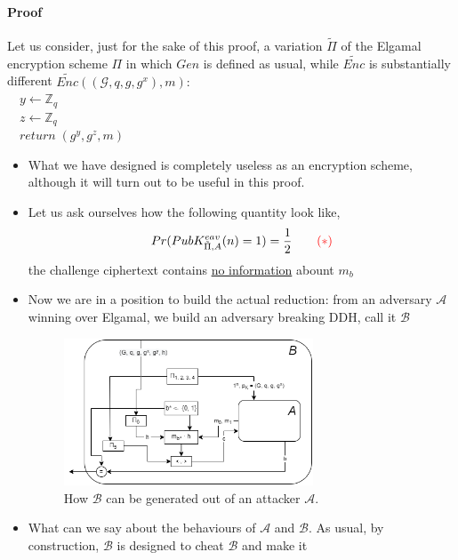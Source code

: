 \documentclass[../main]{subfiles}
\begin{document}
\paragraph{Proof}
    Let us consider, just for the sake of this proof, a variation $\tilde{\Pi}$ of the Elgamal encryption scheme $\Pi$ in which $Gen$ is
    defined as usual, while $\tilde{Enc}$ is substantially different
    \newline
    \noindent
    $\textbf{$\tilde{Enc}$} ((\mathcal{G}, q, g, g^x), m):$\\
    $\quad{} y \leftarrow{} \mathbb{Z}_q$\\
    $\quad{} z \leftarrow{} \mathbb{Z}_q$\\
    $\quad{} \textit{return} \; (g^y, g^z, m) $
    \begin{itemize}
        \item What we have designed is completely useless as an encryption scheme, although it will turn out to be useful in this proof.
        \item Let us ask ourselves how the following quantity look like, $$Pr(PubK^{eav}_{\tilde{\Pi}, A}(n) = 1) = \frac{1}{2} \quad\quad \textcolor{red}{(*)}$$
              the challenge ciphertext contains \underline{no information} abount $m_b$
        \item Now we are in a position to build the actual reduction: from an adversary $\mathcal{A}$ winning over Elgamal, we build an adversary
              breaking DDH, call it $\mathcal{B}$
              \begin{figure}[H]
                \centering
                \includegraphics[width=0.7\textwidth]{images/security_of_elgamal_scheme}
                \caption{How $\mathcal{B}$ can be generated out of an attacker $\mathcal{A}.$}
              \end{figure}
        \item What can we say about the behaviours of $\mathcal{A}$ and $\mathcal{B}$. As usual, by construction, $\mathcal{B}$ is designed to cheat $\mathcal{B}$ and make it

\end{itemize}
\end{document}
